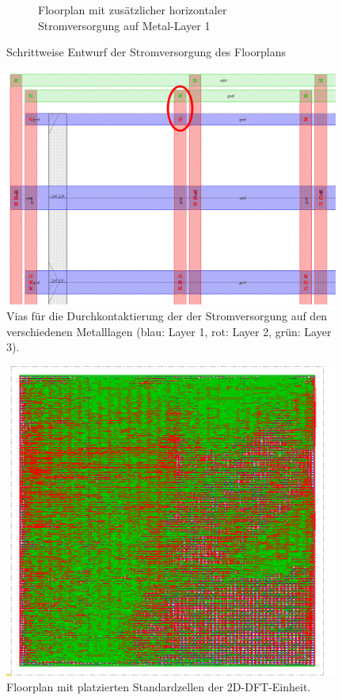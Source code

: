 \begin{figure}
\begin{subfigure}[b]{0.475\textwidth}
            \caption{{\small Floorplan mit zusätzlicher horizontaler Stromversorgung auf Metal-Layer 1}}    
            \label{pic:floorplan4}
        \end{subfigure}
        \caption{Schrittweise Entwurf der Stromversorgung des Floorplans} 
        \label{fig:floorplanSpannungsversorgung}
    \end{figure}

    
    \begin{figure}[ht!]
     \centering
     \includegraphics[width=0.98\textwidth]{img/DFT_FLOORPLAN/CROPPED_IMG/Vias.png}
     \caption{Vias für die Durchkontaktierung der der Stromversorgung auf den verschiedenen Metalllagen (blau: Layer 1, rot: Layer 2, grün: Layer 3).}
     \label{pic:floorplanVias}
    \end{figure}
    
    
    \begin{figure}[ht!]
     \centering
     \includegraphics[width=0.98\textwidth]{img/DFT_FLOORPLAN/CROPPED_IMG/FP_5.png}
     \caption{Floorplan mit platzierten Standardzellen der 2D-DFT-Einheit.}
     \label{pic:floorplan1Standardzellen}
    \end{figure}

